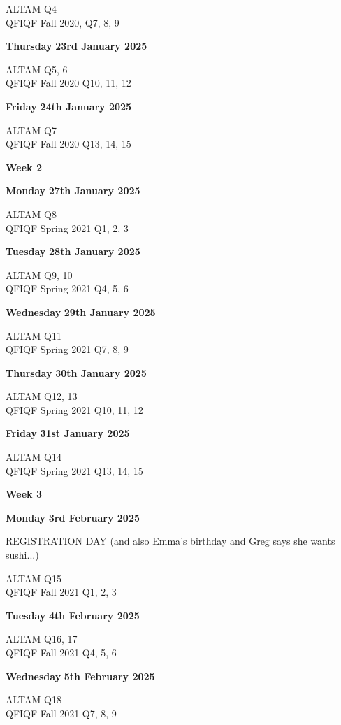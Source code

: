 \documentclass[hidelinks, 12pt]{article}
\theoremstyle{mydefstyle}
\theoremstyle{mythmstyle}
\begin{document}
ALTAM Q4 \\
QFIQF Fall 2020, Q7, 8, 9

\textbf{Thursday} \hfill \textbf{23rd January 2025}

ALTAM Q5, 6 \\
QFIQF Fall 2020 Q10, 11, 12

\textbf{Friday} \hfill \textbf{24th January 2025}

ALTAM Q7 \\
QFIQF Fall 2020 Q13, 14, 15

\begin{center}
\textbf{Week 2}
\end{center}

\textbf{Monday} \hfill \textbf{27th January 2025}

ALTAM Q8 \\
QFIQF Spring 2021 Q1, 2, 3

\textbf{Tuesday} \hfill \textbf{28th January 2025}

ALTAM Q9, 10 \\
QFIQF Spring 2021 Q4, 5, 6

\textbf{Wednesday} \hfill \textbf{29th January 2025}

ALTAM Q11 \\
QFIQF Spring 2021 Q7, 8, 9

\textbf{Thursday} \hfill \textbf{30th January 2025}

ALTAM Q12, 13 \\
QFIQF Spring 2021 Q10, 11, 12

\textbf{Friday} \hfill \textbf{31st January 2025}

ALTAM Q14 \\
QFIQF Spring 2021 Q13, 14, 15

\begin{center}
\textbf{Week 3}
\end{center}

\textbf{Monday} \hfill \textbf{3rd February 2025}

REGISTRATION DAY (and also Emma's birthday and Greg says she wants sushi...)

ALTAM Q15 \\
QFIQF Fall 2021 Q1, 2, 3

\textbf{Tuesday} \hfill \textbf{4th February 2025}

ALTAM Q16, 17 \\
QFIQF Fall 2021 Q4, 5, 6

\textbf{Wednesday} \hfill \textbf{5th February 2025}

ALTAM Q18 \\
QFIQF Fall 2021 Q7, 8, 9
\end{document}
